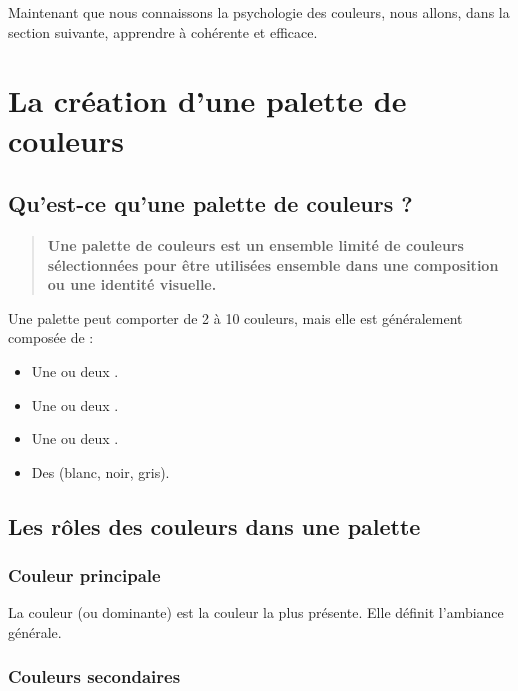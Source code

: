 Maintenant que nous connaissons la psychologie des couleurs, nous allons, dans la section suivante, apprendre à  cohérente et efficace.

\section{La création d'une palette de couleurs}

\subsection{Qu'est-ce qu'une palette de couleurs ?}

\begin{quote}
\textbf{Une palette de couleurs est un ensemble limité de couleurs sélectionnées pour être utilisées ensemble dans une composition ou une identité visuelle.}
\end{quote}

Une palette peut comporter de 2 à 10 couleurs, mais elle est généralement composée de :

\begin{itemize}
    \item Une ou deux .
    \item Une ou deux .
    \item Une ou deux .
    \item Des  (blanc, noir, gris).
\end{itemize}

\subsection{Les rôles des couleurs dans une palette}

\subsubsection{Couleur principale}

La couleur  (ou dominante) est la couleur la plus présente. Elle définit l'ambiance générale.

\subsubsection{Couleurs secondaires}

